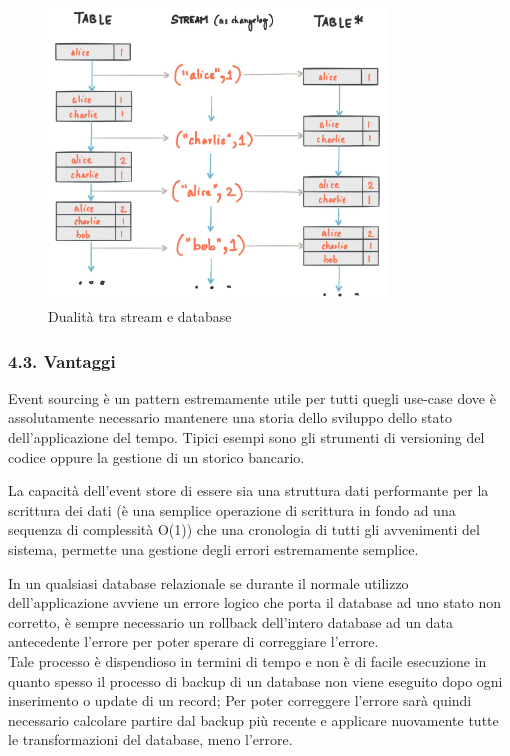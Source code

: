 \documentclass[]{article}
\begin{document}
\begin{figure}
\centering
\includegraphics[width=0.80000\textwidth]{../images/streams-table-duality.jpg}
\caption{Dualità tra stream e database \label{figure_2}}
\end{figure}

\newpage

\subsubsection{4.3. Vantaggi}\label{vantaggi}

Event sourcing è un pattern estremamente utile per tutti quegli use-case
dove è assolutamente necessario mantenere una storia dello sviluppo
dello stato dell'applicazione del tempo. Tipici esempi sono gli
strumenti di versioning del codice oppure la gestione di un storico
bancario.

La capacità dell'event store di essere sia una struttura dati
performante per la scrittura dei dati (è una semplice operazione di
scrittura in fondo ad una sequenza di complessità O(1)) che una
cronologia di tutti gli avvenimenti del sistema, permette una gestione
degli errori estremamente semplice.

In un qualsiasi database relazionale se durante il normale utilizzo
dell'applicazione avviene un errore logico che porta il database ad uno
stato non corretto, è sempre necessario un rollback dell'intero database
ad un data antecedente l'errore per poter sperare di correggiare
l'errore.\\
Tale processo è dispendioso in termini di tempo e non è di facile
esecuzione in quanto spesso il processo di backup di un database non
viene eseguito dopo ogni inserimento o update di un record; Per poter
correggere l'errore sarà quindi necessario calcolare partire dal backup
più recente e applicare nuovamente tutte le transformazioni del
database, meno l'errore.
\end{document}
